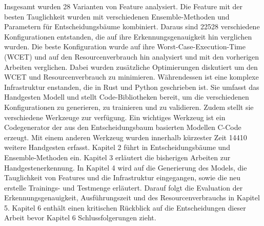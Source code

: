 \newline
Insgesamt wurden 28 Varianten von Feature analysiert. Die Feature mit der besten Tauglichkeit wurden mit verschiedenen Ensemble-Methoden und Parametern für Entscheidungsbäume kombiniert. Daraus sind
22528 verschiedene Konfigurationen entstanden, die auf ihre Erkennungsgenauigkeit hin verglichen wurden. Die beste Konfiguration wurde auf ihre Worst-Case-Execution-Time (WCET) und auf den Resourcenverbrauch
hin analysiert und mit den vorherigen Arbeiten verglichen. Dabei wurden zusätzliche Optimierungen diskutiert um den WCET und Resourcenverbrauch zu minimieren. Währendessen ist eine komplexe Infrastruktur
enstanden, die in Rust und Python geschrieben ist. Sie umfasst das Handgesten Modell und stellt Code-Bibliotheken bereit, um die verschiedenen Konfigurationen zu generieren, zu trainieren und zu validieren.
Zudem stellt sie verschiedene Werkzeuge zur verfügung. Ein wichtiges Werkzeug ist ein Codegenerator der aus den Entscheidungsbaum basierten Modellen C-Code erzeugt. Mit einem anderen Werkzeug wurden
innerhalb kürzester Zeit 14410 weitere Handgesten erfasst.
\newline
\newline
Kapitel 2 führt in Entscheidungsbäume und Ensemble-Methoden ein. Kapitel 3 erläutert die bisherigen Arbeiten zur Handgestenerkennung. In Kapitel 4 wird auf die Generierung des Models, die Tauglichkeit von
Features und die Infrastruktur eingegangen, sowie die neu erstelle Trainings- und Testmenge erläutert. Darauf folgt die Evaluation der Erkennungsgenauigkeit, Ausführungszeit und des Resourcenverbrauchs in
Kapitel 5. Kapitel 6 enthält einen kritischen Rückblick auf die Entscheidungen dieser Arbeit bevor Kapitel 6 Schlussfolgerungen zieht.